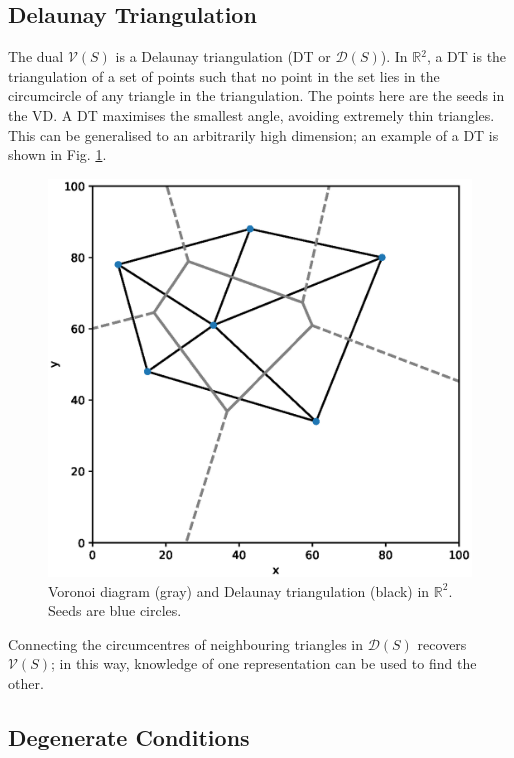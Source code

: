 \documentclass[12pt, report, a4paper, titlepage]{article}
\numberwithin{equation}{section}
\begin{document}
\subsection{Delaunay Triangulation}

The dual $\mathcal{V}(S)$ is a Delaunay triangulation (DT or $\mathcal{D}(S)$). In $\mathbb{R}{^2}$, a DT is the triangulation of a set of points such that no point in the set lies in the circumcircle of any triangle in the triangulation. The points here are the seeds in the VD. A DT maximises the smallest angle, avoiding extremely thin triangles. This can be generalised to an arbitrarily high dimension; an example of a DT is shown in Fig. \ref{simple-dt}.

\begin{figure}[h!]
	\center
 	\includegraphics[width=.9\linewidth]{voronoi-simple-delaunay.eps}
    \caption{Voronoi diagram (gray) and Delaunay triangulation (black) in $\mathbb{R}^2$. Seeds are blue circles.}
    \label{simple-dt}
\end{figure}

Connecting the circumcentres of neighbouring triangles in $\mathcal{D}(S)$ recovers $\mathcal{V}(S)$; in this way, knowledge of one representation can be used to find the other.

\subsection{Degenerate Conditions}
\end{document}
